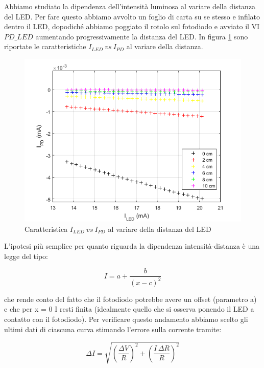 \documentclass[journal, a4paper]{IEEEtran}
\begin{document}
Abbiamo studiato la dipendenza dell'intensità luminosa al variare della distanza del LED. Per fare questo abbiamo avvolto un foglio di carta su se stesso e infilato dentro il LED, dopodiché abbiamo poggiato il rotolo sul fotodiodo e avviato il VI \texttt{$PD\_LED$} aumentando progressivamente la distanza del LED. In figura \ref{fig:dist} sono riportate le caratteristiche $I_{LED}~ vs~I_{PD}$ al variare della distanza.

\begin{figure}[htp]
\centering
\includegraphics[scale=.6]{distance}
\caption{Caratteristica $I_{LED}~ vs~I_{PD}$ al variare della distanza del LED}
\label{fig:dist}
\end{figure}

L'ipotesi più semplice per quanto riguarda la dipendenza intensità-distanza è una legge del tipo:

\begin{equation}
\label{eqn:fit}
I = a + \frac{b}{(x-c)^2}
\end{equation}

che rende conto del fatto che il fotodiodo potrebbe avere un offset (parametro a) e che per x = 0 I resti finita (idealmente quello che si osserva ponendo il LED a contatto con il fotodiodo). Per verificare questo andamento abbiamo scelto gli ultimi dati di ciascuna curva stimando l'errore sulla corrente tramite:

\begin{equation}
\Delta I = \sqrt{(\frac{\Delta V}{R})^2 + (\frac{I\, \Delta R}{R})^2}
\end{equation}
\end{document}
